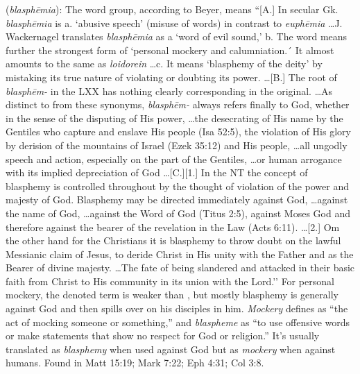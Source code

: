 \item[Blasphemy,]

(\textit{blasphēmia}):
The word group, according to Beyer, means 
``[A.] In secular Gk. \emph{blasphēmia} is a. `abusive speech' (misuse of words) in contrast to \emph{euphēmia} \ldots J. Wackernagel translates \emph{blasphēmia} as a `word of evil sound,' b. The word means further the strongest form of `personal mockery and calumniation.´ It almost amounts to the same as \emph{loidorein} \ldots c. It means `blasphemy of the deity' by mistaking its true nature of violating or doubting its power. \ldots [B.] The root of \emph{blasphēm-} in the LXX has nothing clearly corresponding in the original. \ldots As distinct to from these synonyms, \emph{blasphēm-} always refers finally to God, whether in the sense of the disputing of His power, \ldots the desecrating of His name by the Gentiles who capture and enslave His people (Isa 52:5), the violation of His glory by derision of the mountains of Israel (Ezek 35:12) and His people, \ldots all ungodly speech and action, especially on the part of the Gentiles, \ldots or human arrogance with its implied depreciation of God \ldots [C.][1.] In the NT the concept of blasphemy is controlled throughout by the thought of violation of the power and majesty of God. Blasphemy may be directed immediately against God, \ldots against the name of God, \ldots against the Word of God (Titus 2:5), against Moses God and therefore against the bearer of the revelation in the Law (Acts 6:11). \ldots [2.] Om the other hand for the Christians it is blasphemy to throw doubt on the lawful Messianic claim of Jesus, to deride Christ in His unity with the Father and as the Bearer of divine majesty. \ldots The fate of being slandered and attacked in their basic faith from Christ to His community in its union with the Lord.'' 
For personal mockery, the denoted term is weaker than , but mostly blasphemy is generally against God and then spills over on his disciples in him. \emph{Mockery} defines as ``the act of mocking someone or something,'' and \emph{blaspheme} as ``to use offensive words or make statements that show no respect for God or religion.'' It's usually translated as \emph{blasphemy} when used against God but as \emph{mockery} when against humans.
Found in Matt 15:19; Mark 7:22; Eph 4:31; Col 3:8.
